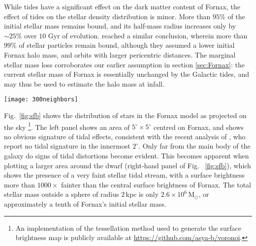 \documentclass[fleqn,usenatbib]{mnras}
\begin{document}
While tides have a significant effect on the dark matter content of Fornax, the effect of tides on the stellar density distribution is minor. More than $95\%$ of the initial stellar mass remains bound, and its half-mass radius increases only by $\sim 25\%$ over $10$ Gyr of evolution. \citet{Battaglia2015} reached a similar conclusion, wherein more than $99\%$ of stellar particles remain bound, although they assumed a lower initial Fornax halo mass, and orbits with larger pericentric distances. The marginal stellar mass loss corroborates our earlier assumption in section \ref{sec:Fornax}: the current stellar mass of Fornax is essentially unchanged by the Galactic tides, and may thus be used to estimate the halo mass at infall.

\begin{figure*}
	\texttt{[image: 300neighbors]}
        \caption{Surface brightness of the evolved Fornax model on orbit 1. At a heliocentric distance of 137\,kpc, one degree in this figure corresponds to 2.4\,kpc. The left panel shows an area of 25 deg$^2$ centred on Fornax. Deviations from spherical symmetry in the surface brightness become only evident in regions where the surface brightness drops below 1/1000 of its central value. The panel on the right shows a larger 900 deg$^2$ areas and suggest the presence of a faint stellar stream. The line passing along the tidal stream in the right-hand panel indicates the orbital path of Fornax.}
    \label{fig:sfb}
\end{figure*}

Fig.~\ref{fig:sfb} shows the distribution of stars in the Fornax model as projected on the sky \footnote{An implementation of the tessellation method used to generate the surface brightness map is publicly available at \url{https://github.com/asya-b/voronoi}.}. The left panel shows an area of $5^\circ \times 5^\circ$ centred on Fornax, and shows no obvious signature of tidal effects, consistent with the recent analysis of  \citet{Wang2019}, who report no tidal signature in the innermost $2^\circ$. Only far from the main body of the galaxy  do signs of tidal distortions become evident. This becomes apparent  when plotting a larger area around the dwarf (right-hand panel of Fig. ~\ref{fig:sfb}),  which shows the presence of a very faint stellar tidal stream, with a surface brightness more  than $1000\times$ fainter than the central surface brightness of Fornax. The total stellar mass outside a sphere of radius 2\,kpc is only $2.6\times 10^6$\,M$_\odot$, or approximately a tenth of Fornax's initial stellar mass.
\end{document}
